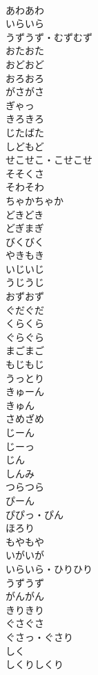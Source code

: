 \documentclass[8pt]{extreport}
\begin{document}
\begin{CJK}{UTF8}{min}
\\	あわあわ	
\\	いらいら	
\\	うずうず・むずむず	
\\	おたおた	
\\	おどおど	
\\	おろおろ	
\\	がさがさ	
\\	ぎゃっ	
\\	きろきろ	
\\	じたばた	
\\	しどもど	
\\	せこせこ・こせこせ	
\\	そそくさ	
\\	そわそわ	
\\	ちゃかちゃか	
\\	どきどき	
\\	どぎまぎ	
\\	びくびく	
\\	やきもき	
\\	いじいじ	
\\	うじうじ	
\\	おずおず	
\\	ぐだぐだ	
\\	くらくら	
\\	ぐらぐら	
\\	まごまご	
\\	もじもじ	
\\	うっとり	
\\	きゅーん	
\\	きゅん	
\\	さめざめ	
\\	じーん	
\\	じーっ	
\\	じん	
\\	しんみ	
\\	つらつら	
\\	ぴーん	
\\	ぴぴっ・ぴん	
\\	ほろり	
\\	もやもや	
\\	いがいが	
\\	いらいら・ひりひり	
\\	うずうず	
\\	がんがん	
\\	きりきり	
\\	ぐさぐさ	
\\	ぐさっ・ぐさり	
\\	しく	
\\	しくりしくり	

\end{CJK}
\end{document}
